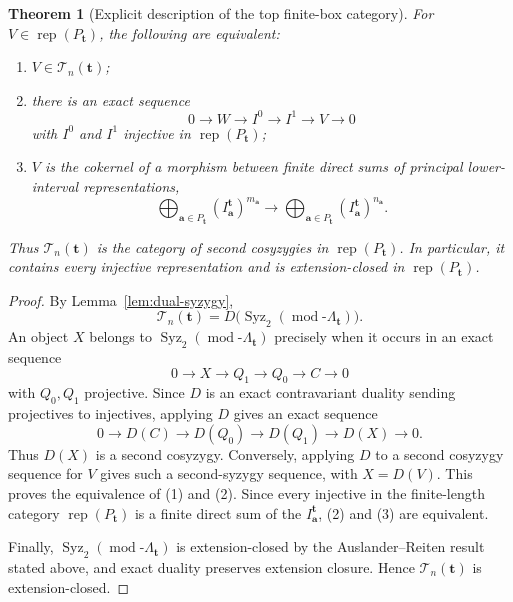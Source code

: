 \documentclass[10pt,a4paper]{amsart}
\newtheorem{theorem}{Theorem}[section]
\newcommand{\Rep}{\operatorname{rep}}
\newcommand{\modcat}{\operatorname{mod}}
\begin{document}
\begin{theorem}[Explicit description of the top finite-box category]\label{thm:top-finite}
For $V\in\Rep(P_{\mathbf t})$, the following are equivalent:
\begin{enumerate}[label=\rm(\arabic*)]
\item $V\in\mathcal T_n(\mathbf t)$;
\item there is an exact sequence
\[
0\longrightarrow W\longrightarrow I^0\longrightarrow I^1\longrightarrow V\longrightarrow0
\]
with $I^0$ and $I^1$ injective in $\Rep(P_{\mathbf t})$;
\item $V$ is the cokernel of a morphism between finite direct sums of principal lower-interval representations,
\[
\bigoplus_{\mathbf a\in P_{\mathbf t}}
   (I^{\mathbf t}_{\mathbf a})^{m_{\mathbf a}}
\longrightarrow
\bigoplus_{\mathbf a\in P_{\mathbf t}}
   (I^{\mathbf t}_{\mathbf a})^{n_{\mathbf a}}.
\]
\end{enumerate}
Thus $\mathcal T_n(\mathbf t)$ is the category of second cosyzygies in $\Rep(P_{\mathbf t})$.  In particular, it contains every injective representation and is extension-closed in $\Rep(P_{\mathbf t})$.
\end{theorem}

\begin{proof}
By Lemma~\ref{lem:dual-syzygy},
\[
\mathcal T_n(\mathbf t)
=
D\bigl(\operatorname{Syz}_2(\modcat\text{-}\Lambda_{\mathbf t})\bigr).
\]
An object $X$ belongs to $\operatorname{Syz}_2(\modcat\text{-}\Lambda_{\mathbf t})$ precisely when it occurs in an exact sequence
\[
0\longrightarrow X\longrightarrow Q_1\longrightarrow Q_0
\longrightarrow C\longrightarrow0
\]
with $Q_0,Q_1$ projective.  Since $D$ is an exact contravariant duality sending projectives to injectives, applying $D$ gives an exact sequence
\[
0\longrightarrow D(C)\longrightarrow D(Q_0)\longrightarrow D(Q_1)
\longrightarrow D(X)\longrightarrow0.
\]
Thus $D(X)$ is a second cosyzygy.  Conversely, applying $D$ to a second
cosyzygy sequence for $V$ gives such a second-syzygy sequence, with
$X=D(V)$.  This proves the equivalence of (1) and (2).  Since every injective
in the finite-length category $\Rep(P_{\mathbf t})$ is a finite direct sum of
the $I^{\mathbf t}_{\mathbf a}$, (2) and (3) are equivalent.

Finally, $\operatorname{Syz}_2(\modcat\text{-}\Lambda_{\mathbf t})$ is extension-closed by the Auslander--Reiten result stated above, and exact duality preserves extension closure.  Hence $\mathcal T_n(\mathbf t)$ is extension-closed.
\end{proof}
\end{document}
